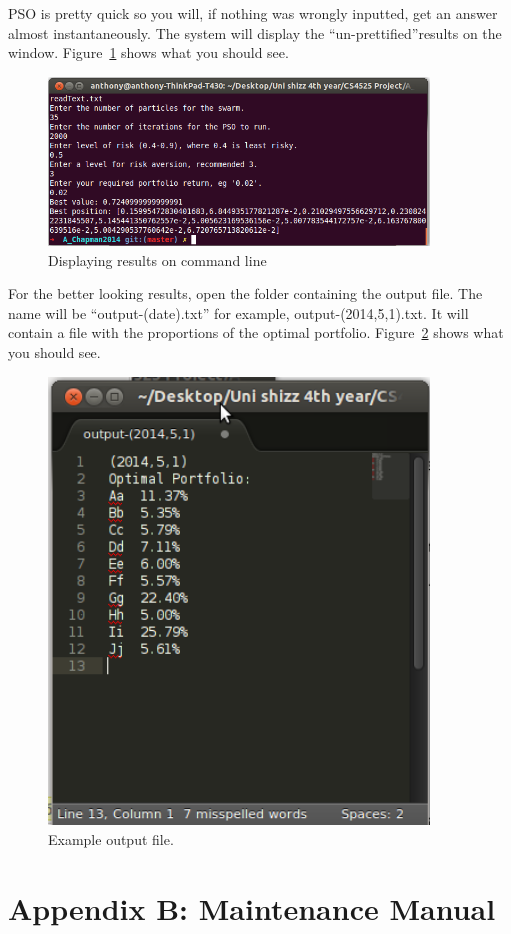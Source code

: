 \documentclass{pdfmx4020}
\begin{document}
PSO is pretty quick so you will, if nothing was wrongly inputted, get an answer almost instantaneously. The system will display the ``un-prettified''results on the window. Figure~\ref{fig:results} shows what you should see. 
\begin{figure}[H]
  \centering
    \includegraphics[width=0.9\textwidth]{results}
  \caption{Displaying results on command line}
  \label{fig:results}
\end{figure}
For the better looking results, open the folder containing the output file. The name will be ``output-(date).txt'' for example, output-(2014,5,1).txt. It will contain a file with the proportions of the optimal portfolio. Figure~\ref{fig:output} shows what you should see. 
\begin{figure}[H]
  \centering
    \includegraphics[width=0.9\textwidth]{output}
  \caption{Example output file.}
  \label{fig:output}
\end{figure}

\chapter*{Appendix B: Maintenance Manual}
\end{document}
